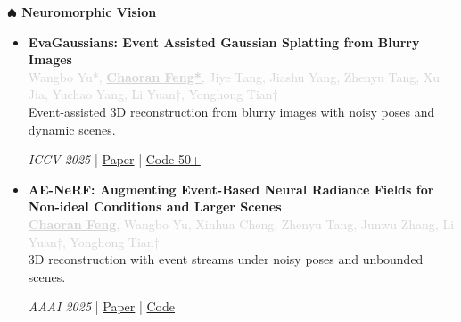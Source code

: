 \documentclass[11pt, a4paper]{article}
\newcommand{\secondarycolor}[1]{\textcolor{lightgray}{#1}}
\newenvironment{projectentry}[3]{
    \vspace{8pt}
    \textbf{#1} \\
    \secondarycolor{#2} \\
    #3
    \vspace{6pt}
}{}
\begin{document}
\begin{minipage}[t]{0.7\textwidth}
\vspace{10pt}

{\color{darkblue}\textbf{$\spadesuit$ Neuromorphic Vision}}

\begin{itemize}[leftmargin=0pt, itemsep=8pt]
    \item \begin{projectentry}
        { EvaGaussians: Event Assisted Gaussian Splatting from Blurry Images}
        {Wangbo Yu*, \textbf{\underline{Chaoran Feng*}}, Jiye Tang, Jiashu Yang, Zhenyu Tang, Xu Jia, Yuchao Yang, Li Yuan†, Yonghong Tian†}
        {Event-assisted 3D reconstruction from blurry images with noisy poses and dynamic scenes.}
        \end{projectentry}
        \textit{ICCV 2025} | \href{https://arxiv.org/abs/2405.20224}{Paper} | \href{https://github.com/SuperFCR}{Code 50+}
        
    \item \begin{projectentry}
        { AE-NeRF: Augmenting Event-Based Neural Radiance Fields for Non-ideal Conditions and Larger Scenes}
        {\textbf{\underline{Chaoran Feng}}, Wangbo Yu, Xinhua Cheng, Zhenyu Tang, Junwu Zhang, Li Yuan†, Yonghong Tian†}
        {3D reconstruction with event streams under noisy poses and unbounded scenes.}
        \end{projectentry}
        \textit{AAAI 2025} | \href{https://arxiv.org/pdf/2501.02807}{Paper} | \href{https://drexubery.github.io/EvaGaussians/}{Code}
\end{itemize}

\end{minipage}%
\hfill%
\end{document}
